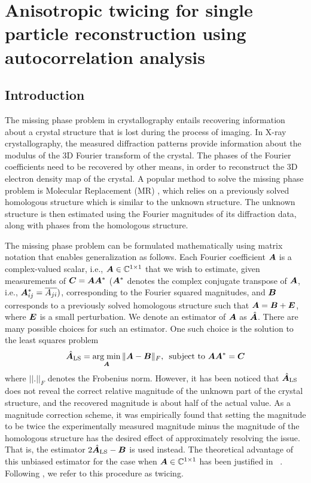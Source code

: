 \chapter{Anisotropic twicing for single particle reconstruction using 
autocorrelation analysis}
\section{Introduction}
The missing phase problem in crystallography entails recovering information
about a crystal structure that is lost during the process of imaging. In X-ray
crystallography, the measured diffraction patterns provide information about the
modulus of the 3D Fourier transform of the crystal. The phases of the Fourier
coefficients need to be recovered by other means, in order to reconstruct the 3D
electron density map of the crystal. 
A popular method to solve the missing phase problem
is Molecular Replacement (MR) \cite{rossmann62, rossmann01, scapin13}, which 
relies on a previously
solved homologous structure which is similar to the unknown structure. The 
unknown
structure is then estimated using the Fourier magnitudes of its diffraction
data, along with phases from the homologous
structure. 

The missing phase problem can be formulated mathematically using matrix notation that enables generalization as follows. Each 
Fourier coefficient $\boldsymbol{A}$ is a complex-valued scalar, i.e., 
$\boldsymbol{A}\in\mathbb{C}^{1\times 1}$ that we wish to estimate, given measurements of
$\boldsymbol{C}=\boldsymbol{A}\boldsymbol{A}^*$ ($\boldsymbol{A}^*$ denotes the complex conjugate transpose of $\boldsymbol{A}$, i.e., 
$\boldsymbol{A}^*_{ij} = \overline{A_{ji}})$, corresponding to the Fourier squared magnitudes, and 
$\boldsymbol{B}$ corresponds to a
previously solved homologous structure such that $\boldsymbol{A}=\boldsymbol{B}+\boldsymbol{E}$, where $\boldsymbol{E}$ is 
a small perturbation. We denote an estimator of $\boldsymbol{A}$ as $\hat{\boldsymbol{A}}$. There
are many possible choices for such an estimator. One such choice is the solution
to the least squares problem
\begin{equation}\label{eq:leastsquareintro}
\hat{\boldsymbol{A}}_{\text{LS}}=\operatorname*{arg\; min}_{\boldsymbol{A}}\|\boldsymbol{A}-\boldsymbol{B}\|_F,\,\,\,\text{subject to 
}\boldsymbol{A}\boldsymbol{A}^*=\boldsymbol{C}
\end{equation}
where $||.||_F$ denotes the Frobenius norm.
However, it has been noticed that $\hat{\boldsymbol{A}}_{\text{LS}}$ does not reveal the 
correct relative magnitude of the unknown part of the crystal structure, and 
the recovered magnitude is about half of the actual value. As a magnitude 
correction scheme, it was empirically found that setting the magnitude to be 
twice the experimentally measured magnitude minus the magnitude of the 
homologous structure has the desired effect of approximately resolving the 
issue.  That is, the estimator $2\hat{\boldsymbol{A}}_{\text{LS}}-\boldsymbol{B}$ is used instead. The theoretical 
advantage of this unbiased estimator for the case when 
$\boldsymbol{A}\in\mathbb{C}^{1\times 1}$ has been justified in
~\cite{Main1979}. Following \cite{tukey77}, we refer to this procedure as 
twicing.

